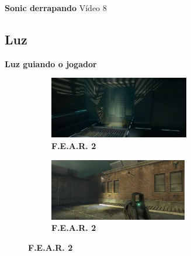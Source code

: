 \expandafter\documentclass\expandafter[table, usenames, svgnames, dvipsnames, \classopts]{beamer}
\begin{document}
\begin{frame}{\textbf{Sonic derrapando}}
	\centering
    Vídeo 8
\end{frame}

\subsection{Luz}
\begin{frame}{\textbf{Luz guiando o jogador}}
	\centering
	\begin{figure}
        \begin{subfigure}{\textwidth}
        	\centering
            \includegraphics[height=2.7cm]{fear1}
            \caption{\scriptsize\textbf{F.E.A.R. 2}\footnotemark{}}
	    \end{subfigure}

        \begin{subfigure}{\textwidth}
	        \centering
            \includegraphics[height=2.7cm]{fear2}
            \caption{\scriptsize\textbf{F.E.A.R. 2}\footnotemark{}}
	    \end{subfigure}
	\end{figure}

\end{frame}


\end{document}
